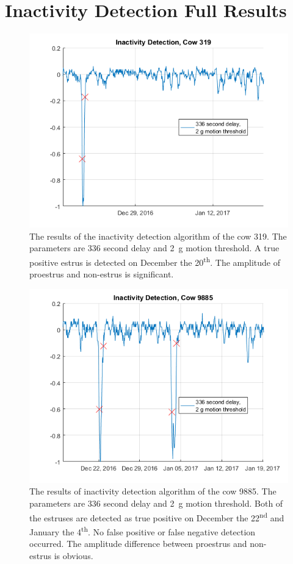 \clearpage
\section{Inactivity Detection Full Results}


\begin{figure}[htb]
\centering
\includegraphics[width = 0.75 \textwidth]{figures/InactivityDetectionCow319.png}
\caption{The results of the inactivity detection algorithm of the cow 319. The parameters are 336 second delay and \SI{2}{\gram} motion threshold. A true positive estrus is detected on December the 20\textsuperscript{th}. The amplitude of proestrus and non-estrus is significant. }
\label{InactivityDetectionCow319}
\end{figure}


\begin{figure}[htb]
\centering
\includegraphics[width = 0.75 \textwidth]{figures/InactivityDetectionCow9885.png}
\caption{The results of inactivity detection algorithm of the cow 9885. The parameters are 336 second delay and \SI{2}{\gram} motion threshold. Both of the estruses are detected as true positive on December the 22\textsuperscript{nd} and January the 4\textsuperscript{th}. No false positive or false negative detection occurred. The amplitude difference between proestrus and non-estrus is obvious.}
\label{InactivityDetectionCow9885}
\end{figure}


